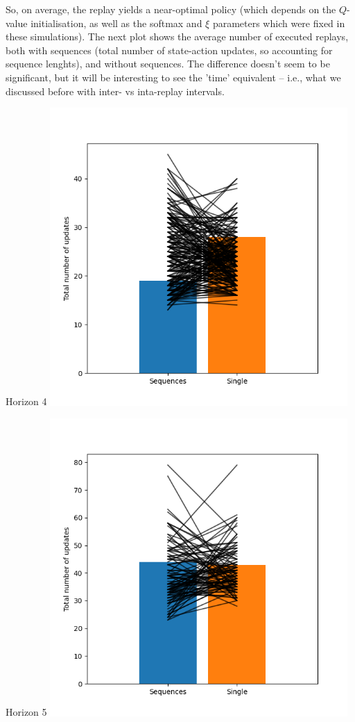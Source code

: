 \documentclass{article}
\begin{document}
So, on average, the replay yields a near-optimal policy (which depends on the $Q$-value initialisation, as well as 
the softmax and $\xi$ parameters which were fixed in these simulations).
\newpage
The next plot shows the average number of executed replays, both with sequences (total number of state-action updates, so 
accounting for sequence lenghts), and without sequences. The difference doesn't seem to be significant, but it will be 
interesting to see the 'time' equivalent -- i.e., what we discussed before with inter- vs inta-replay intervals.

\vspace*{0.4cm}

\begin{minipage}{0.5\textwidth}
    \centering
    Horizon 4
    \includegraphics[width=0.85\textwidth]{../figures/hor5/num_updates.png}
\end{minipage}%
\begin{minipage}{0.5\textwidth}
    \centering
    Horizon 5
    \includegraphics[width=0.85\textwidth]{../figures/hor6/num_updates.png}
\end{minipage}
\end{document}
